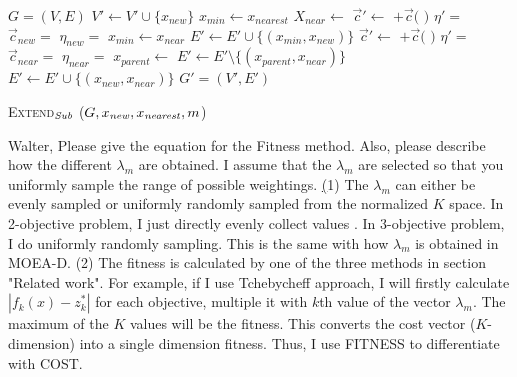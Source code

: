 \documentclass{article}
\begin{document}
\begin{algorithm}[hbtp]
\begin{algorithmic}[1]
	\Return $G=(V,E)$ 
\EndIf
\State $ V' \leftarrow V' \cup \{ x_{new} \} $
\State $ x_{min} \leftarrow x_{nearest} $
\State $ X_{near} \leftarrow $ 
			\State $ \vec{c}' \leftarrow $  $ + \vec{c}( $  $ ) $ 
			\State $ \eta' =  $ 
			\State $ \vec{c}_{new} = $  
			\State $ \eta_{new} = $ 
				\State $ x_{min} \leftarrow x_{near} $
			\EndIf
		\EndIf
	\EndFor
	\State $ E' \leftarrow E' \cup \{ ( x_{min}, x_{new} ) \} $
{}
		\State $ \vec{c}' \leftarrow $  $ + \vec{c}( $  $ ) $ 
		\State $ \eta' =  $ 
		\State $ \vec{c}_{near} = $  
		\State $ \eta_{near} = $ 
			\State $ x_{parent} \leftarrow $ 
			\State $ E' \leftarrow E' \setminus \{ ( x_{parent}, x_{near} ) \} $
			\State $ E' \leftarrow E' \cup \{ ( x_{new}, x_{near} ) \} $
		\EndIf
	\EndIf
\EndFor
\Return $ G' = (V', E') $ 
\end{algorithmic}
\caption{ \textsc{Extend}$_{\it Sub} $ ($ G, x_{\it new}, x_{\it nearest},m$) }
\label{alg:morrtstar:extend:sub}
\end{algorithm} 

{\sc Walter, Please give the equation for the Fitness method.  Also, please describe how the different $\lambda_m$ are obtained.  I assume that the $\lambda_m$ are selected so that you uniformly sample the range of possible weightings.}
{\sc \underline  
(1) The $ \lambda_{m} $ can either be evenly sampled 
or uniformly randomly sampled from the normalized $ K $ space.
In 2-objective problem, I just directly evenly collect values .
In 3-objective problem, I do uniformly randomly sampling.
This is the same with how $ \lambda_{m} $ is obtained in MOEA-D.
(2) The fitness is calculated by one of the three methods in section "Related work".
For example, if I use Tchebycheff approach,
I will firstly calculate $ | f_k(x) - z^{*}_{k} | $ for each objective, multiple it with $ k $th value of the vector $ \lambda_m $.
The maximum of the $ K $ values will be the fitness.
This converts the cost vector ($ K $-dimension) into a single dimension fitness.
Thus, I use FITNESS to differentiate with COST.
}
\end{document}

